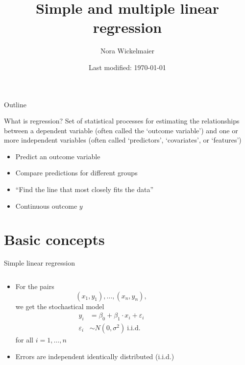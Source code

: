 \documentclass[aspectratio=169]{beamer}
\title{Simple and multiple linear regression}
\author{Nora Wickelmaier}
\date{Last modified: \today}
\begin{document}
\begin{frame}{}
\thispagestyle{empty}
\titlepage
\end{frame}

\begin{frame}{Outline}
\tableofcontents
\end{frame}


\begin{frame}{What is regression?}
  \pause
  Set of statistical processes for estimating the relationships between a
  dependent variable (often called the `outcome variable') and one or more
  independent variables (often called `predictors', `covariates', or
  `features')
  \pause
\vfill
  \begin{itemize}
    \item Predict an outcome variable
    \item Compare predictions for different groups
    \item ``Find the line that most closely fits the data''
    \item Continuous outcome $y$
  \end{itemize}
\end{frame}

\section{Basic concepts}

\begin{frame}{Simple linear regression}
\begin{columns}
\begin{column}{.5\textwidth}
  \begin{itemize}
    \item For the pairs
      \[
        (x_1, y_1), \ldots, (x_n, y_n),
      \]
    we get the stochastical model
      \begin{align*}
        y_i & = \beta_0 + \beta_1 \cdot x_i + \varepsilon_i\\
        \varepsilon_i & \sim N(0, \sigma^2)~\text{i.i.d.}
      \end{align*}
    for all $i = 1, \dots, n$
    \item Errors are independent identically distributed (i.i.d.)
  \end{itemize}
\end{column}
\begin{column}{.5\textwidth}
  
\end{column}
\end{columns}
\end{frame}
\end{document}
